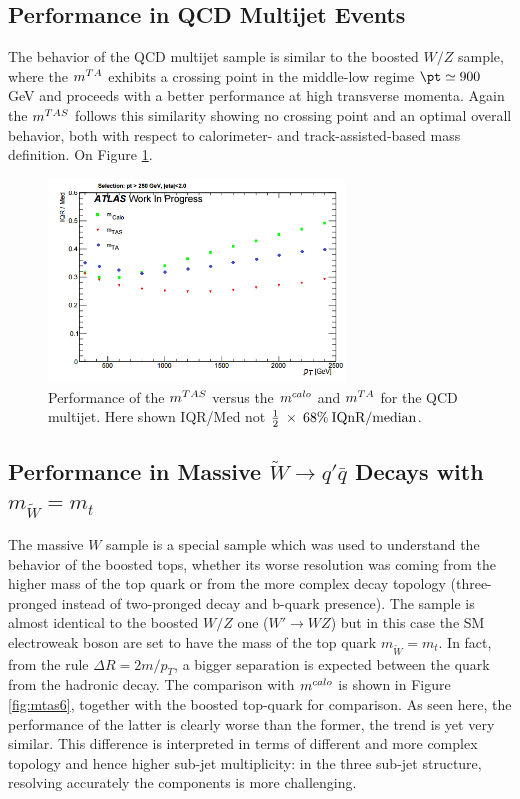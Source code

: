 \subsection{Performance in QCD Multijet Events}
The behavior of the QCD multijet sample is similar to the boosted $W/Z$ sample, where the $m^{TA}$ exhibits a crossing point in the middle-low regime $\pt\simeq900$ GeV and proceeds with a better performance at high transverse momenta.
Again the $\mtas$ follows this similarity showing no crossing point and an optimal overall behavior, both with respect to calorimeter- and track-assisted-based mass definition. On Figure \ref{fig:mtas5}.

\begin{figure}[!ht]
  \centering
        \includegraphics[width=0.7\textwidth]{jet_part/mtas/qcdmtastruffa.png}
   \caption[$\mtas$ for QCD jets]{Performance of the $\mtas$ versus the $m^{calo}$ and $m^{TA}$ for the QCD multijet. Here shown IQR/Med not $\frac{1}{2}\: \times\: 68\% \:\textrm{IQnR/median}$.}
  \label{fig:mtas5}
\end{figure}

\subsection{Performance in Massive $\tilde{W}\to q'\bar{q}$ Decays with $m_{\tilde{W}}=m_t$}
The massive $W$ sample is a special sample which was used to understand the behavior of the boosted tops, whether its worse resolution was coming from the higher mass of the top quark or from the more complex decay topology (three-pronged instead of two-pronged decay and b-quark presence). 
The sample is almost identical to the boosted $W/Z$ one ($W'\to WZ$) but in this case the SM electroweak boson are set to have the mass of the top quark $m_{\tilde{W}}=m_t$.
In fact, from the rule $\Delta R=2m/p_T$, a bigger separation is expected between the quark from the hadronic decay.
The comparison with $m^{calo}$ is shown in Figure \ref{fig:mtas6}, together with the boosted top-quark for comparison. As seen here, the performance of the latter is clearly worse than the former, the trend is yet very similar. This difference is interpreted in terms of different and more complex topology and hence higher sub-jet multiplicity: in the three sub-jet structure, resolving accurately the components is more challenging.

